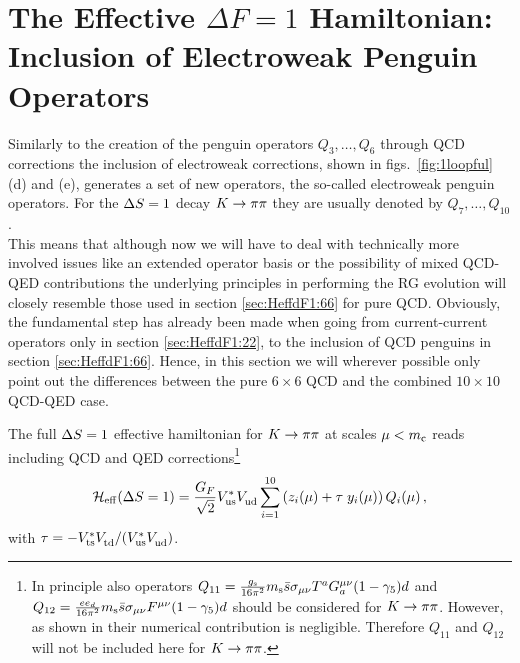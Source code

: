 \section{The Effective $\Delta F=1$ Hamiltonian: Inclusion of
         Electroweak Penguin Operators}
         \label{sec:HeffdF1:1010}
Similarly to the creation of the penguin operators $Q_3,\ldots,Q_6$
through QCD corrections the inclusion of electroweak corrections, shown
in figs.\ \ref{fig:1loopful}\,(d) and (e), generates a set of new
operators, the so-called electroweak penguin operators. For the $\Delta S=1$
decay $K \to \pi\pi$ they are usually denoted by $Q_7, \ldots,Q_{10}$. \\
This means that although now we will have to deal with technically more
involved issues like an extended operator basis or the possibility of
mixed QCD-QED contributions the underlying principles in performing the
RG evolution will closely resemble those used in section \ref{sec:HeffdF1:66}
for pure QCD. Obviously, the fundamental step has already been made
when going from current-current operators only in
section \ref{sec:HeffdF1:22}, to the inclusion of QCD penguins in
section \ref{sec:HeffdF1:66}. Hence, in this section we will wherever
possible only point out the differences between the pure $6 \times 6$
QCD and the combined $10 \times 10$ QCD-QED case.

The full $\Delta S=1$ effective hamiltonian for $K \to \pi\pi$ at scales
$\mu < m_{\rm c}$ reads including QCD and QED corrections\footnote{
In principle also operators $Q_{11} = \frac{g_{\rm s}}{16 \pi^2} m_{\rm s}
\bar s \sigma_{\mu\nu} T^a G_a^{\mu\nu} (1-\gamma_5) d$ and $Q_{12} =
\frac{e e_d}{16 \pi^2} m_{\rm s} \bar s \sigma_{\mu\nu} F^{\mu\nu}
(1-\gamma_5) d$ should be considered for $K \to \pi\pi$. However, as shown in
\cite{bertolinietal:94} their numerical contribution is negligible.
Therefore $Q_{11}$ and $Q_{12}$ will not be included here for
$K \to \pi\pi$.}
\begin{equation}
{\cal H}_{\rm eff}(\Delta S=1) = \frac{G_F}{\sqrt{2}} V_{\rm us}^* V_{\rm ud}^{} \sum_{i=1}^{10}
\left( z_i(\mu) + \tau \; y_i(\mu) \right) Q_i(\mu) \, ,
\label{eq:HeffdF1:1010}
\end{equation}
with $\tau=-V_{\rm ts}^* V_{\rm td}^{}/(V_{\rm us}^* V_{\rm ud}^{})$.
